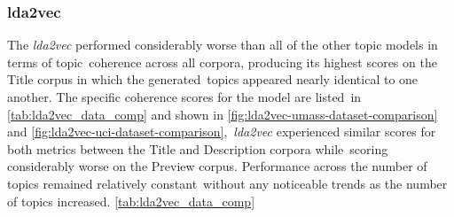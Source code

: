 \documentclass[letterpaper,12pt]{article}
\begin{document}
\subsubsection{lda2vec}
The \emph{lda2vec} performed considerably worse than all of the other topic models in terms of topic\
coherence across all corpora, producing its highest scores on the Title corpus in which the generated\
topics appeared nearly identical to one another. The specific coherence scores for the model are listed\
in \ref{tab:lda2vec_data_comp} and shown in \ref{fig:lda2vec-umass-dataset-comparison} and \ref{fig:lda2vec-uci-dataset-comparison},\
\emph{lda2vec} experienced similar scores for both metrics between the Title and Description corpora while\
scoring considerably worse on the Preview corpus. Performance across the number of topics remained relatively constant\
without any noticeable trends as the number of topics increased.
\ref{tab:lda2vec_data_comp}
\end{document}
